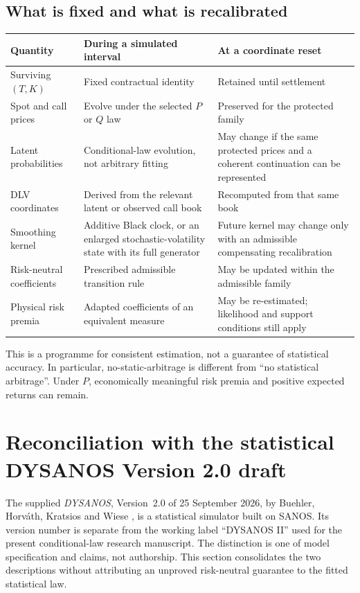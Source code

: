 \documentclass[11pt,a4paper]{article}
\numberwithin{equation}{section}
\theoremstyle{definition}\newtheorem{definition}[theorem]{Definition}
\theoremstyle{remark}\newtheorem{remark}[theorem]{Remark}
\begin{document}
\subsection{What is fixed and what is recalibrated}
\begin{center}
\small
\begin{tabularx}{\textwidth}{@{}>{\raggedright\arraybackslash}p{}>{\raggedright\arraybackslash}X>{\raggedright\arraybackslash}X@{}}
\toprule
Quantity & During a simulated interval & At a coordinate reset\\
\midrule
Surviving $(T,K)$ & Fixed contractual identity & Retained until settlement\\
Spot and call prices & Evolve under the selected $P$ or $Q$ law & Preserved for the protected family\\
Latent probabilities & Conditional-law evolution, not arbitrary fitting & May change if the same protected prices and a coherent continuation can be represented\\
DLV coordinates & Derived from the relevant latent or observed call book & Recomputed from that same book\\
Smoothing kernel & Additive Black clock, or an enlarged stochastic-volatility state with its full generator & Future kernel may change only with an admissible compensating recalibration\\
Risk-neutral coefficients & Prescribed admissible transition rule & May be updated within the admissible family\\
Physical risk premia & Adapted coefficients of an equivalent measure & May be re-estimated; likelihood and support conditions still apply\\
\bottomrule
\end{tabularx}
\end{center}
This is a programme for consistent estimation, not a guarantee of statistical accuracy. In particular, no-static-arbitrage is different from ``no statistical arbitrage''. Under $P$, economically meaningful risk premia and positive expected returns can remain.

\section{Reconciliation with the statistical DYSANOS Version 2.0 draft}
\label{sec:statistical-bridge}
The supplied \emph{DYSANOS}, Version~2.0 of 25 September 2026, by Buehler, Horv\'ath, Kratsios and Wiese \cite{DYSANOSv2}, is a statistical simulator built on SANOS. Its version number is separate from the working label ``DYSANOS II'' used for the present conditional-law research manuscript. The distinction is one of model specification and claims, not authorship. This section consolidates the two descriptions without attributing an unproved risk-neutral guarantee to the fitted statistical law.
\end{document}
